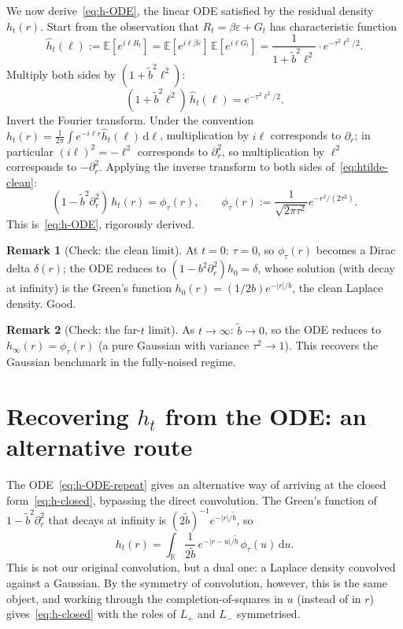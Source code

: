 \documentclass[11pt,a4paper,openany]{book}
\theoremstyle{plainserif}
\theoremstyle{definition}
\theoremstyle{remarkstyle}
\newtheorem*{remark}{Remark}
\newcommand{\R}{\mathbb{R}}
\newcommand{\E}{\mathbb{E}}
\newcommand{\btilde}{\tilde{b}}
\newcommand{\hatfn}[1]{\widehat{#1}}
\begin{document}
We now derive~\eqref{eq:h-ODE}, the linear ODE satisfied by the residual
density $h_t(r)$. Start from the observation that $R_t = \beta\varepsilon + G_t$
has characteristic function
\begin{equation}
\hatfn{h}_t(\ell) := \E[e^{i\ell R_t}]
 = \E[e^{i\ell\beta\varepsilon}]\,\E[e^{i\ell G_t}]
 = \frac{1}{1 + \btilde^2 \ell^2}\cdot e^{-\tau^2 \ell^2/2}.
\label{eq:htilde-lit}
\end{equation}
Multiply both sides by $(1 + \btilde^2 \ell^2)$:
\begin{equation}
(1 + \btilde^2 \ell^2)\,\hatfn{h}_t(\ell) = e^{-\tau^2 \ell^2/2}.
\label{eq:htilde-clean}
\end{equation}
Invert the Fourier transform. Under the convention
$h_t(r) = \frac{1}{2\pi}\int e^{-i\ell r}\hatfn{h}_t(\ell)\,\mathrm{d}\ell$,
multiplication by $i\ell$ corresponds to $\partial_r$; in particular
$(i\ell)^2 = -\ell^2$ corresponds to $\partial_r^2$, so multiplication by
$\ell^2$ corresponds to $-\partial_r^2$. Applying the inverse transform to
both sides of~\eqref{eq:htilde-clean}:
\begin{equation}
(1 - \btilde^2 \partial_r^2)\,h_t(r) = \phi_\tau(r),\qquad
\phi_\tau(r) := \frac{1}{\sqrt{2\pi\tau^2}} e^{-r^2/(2\tau^2)}.
\label{eq:h-ODE-repeat}
\end{equation}
This is~\eqref{eq:h-ODE}, rigorously derived.

\begin{remark}[Check: the clean limit]
At $t=0$: $\tau = 0$, so $\phi_\tau(r)$ becomes a Dirac delta $\delta(r)$;
the ODE reduces to $(1 - b^2 \partial_r^2) h_0 = \delta$, whose solution
(with decay at infinity) is the Green's function
$h_0(r) = (1/2b)e^{-|r|/b}$, the clean Laplace density. Good.
\end{remark}

\begin{remark}[Check: the far-$t$ limit]
As $t\to\infty$: $\btilde\to 0$, so the ODE reduces to
$h_\infty(r) = \phi_\tau(r)$ (a pure Gaussian with variance $\tau^2\to 1$).
This recovers the Gaussian benchmark in the fully-noised regime.
\end{remark}

\section{Recovering $h_t$ from the ODE: an alternative route}

The ODE~\eqref{eq:h-ODE-repeat} gives an alternative way of arriving at
the closed form~\eqref{eq:h-closed}, bypassing the direct convolution.
The Green's function of $1 - \btilde^2 \partial_r^2$ that decays at
infinity is $(2\btilde)^{-1} e^{-|r|/\btilde}$, so
\begin{equation}
h_t(r) = \int_\R \frac{1}{2\btilde}\,e^{-|r-u|/\btilde}\,\phi_\tau(u)\,\mathrm{d}u.
\end{equation}
This is not our original convolution, but a dual one: a Laplace density
convolved against a Gaussian. By the symmetry of convolution, however,
this is the same object, and working through the completion-of-squares
in $u$ (instead of in $r$) gives~\eqref{eq:h-closed} with the roles of
$L_+$ and $L_-$ symmetrised.
\end{document}
